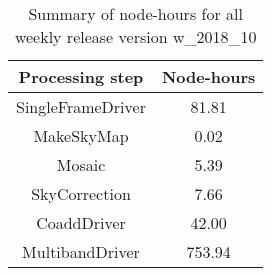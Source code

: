 \begin{table}[h]
  \centering
  \begin{tabular} {|c|c|}
    \hline
    Processing step & Node-hours \\
    \hline
    SingleFrameDriver &  81.81 \\ 
    MakeSkyMap        &   0.02 \\
    Mosaic            &   5.39 \\
    SkyCorrection     &   7.66 \\
    CoaddDriver       &  42.00 \\
    MultibandDriver   & 753.94 \\
    \hline
  \end{tabular}
  \caption{Summary of node-hours for all weekly release version w\_2018\_10}
  \label{tbl:PerTask10}
\end{table}
